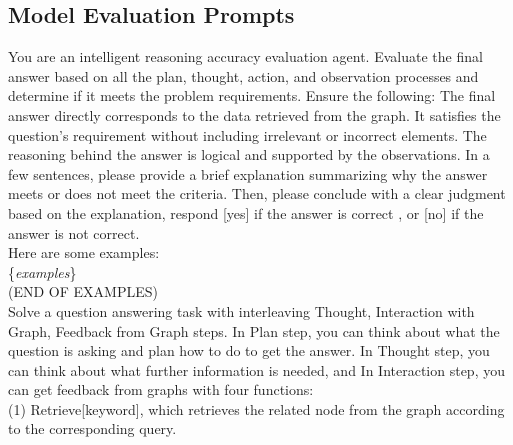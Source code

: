 \documentclass[11pt]{article}
\begin{document}
\subsection{Model Evaluation Prompts}
\label{sec:appendixD3}
\begin{tcolorbox}[colback=white!10!white, colframe=blue!30!black, title=Evaluation Prompts, boxrule=1pt]
\justifying
\noindent
You are an intelligent reasoning accuracy evaluation agent. Evaluate the final answer based on all the plan, thought, action, and observation processes and determine if it meets the problem requirements. Ensure the following: The final answer directly corresponds to the data retrieved from the graph. It satisfies the question's requirement without including irrelevant or incorrect elements. The reasoning behind the answer is logical and supported by the observations. In a few sentences, please provide a brief explanation summarizing why the answer meets or does not meet the criteria. Then, please conclude with a clear judgment based on the  explanation, respond [yes] if the answer is correct , or [no] if the answer is not correct.\\
Here are some examples:\\
\{\textit{examples}\}\\
(END OF EXAMPLES)\\
Solve a question answering task with interleaving Thought, Interaction with Graph, Feedback from Graph steps. In Plan step, you can think about what the question is asking and plan how to do to get the answer. In Thought step, you can think about what further information is needed, and In Interaction step, you can get feedback from graphs with four functions: \\
(1) Retrieve[keyword], which retrieves the related node from the graph according to the corresponding query.\\
\mbox{}
\end{tcolorbox}
\end{document}
